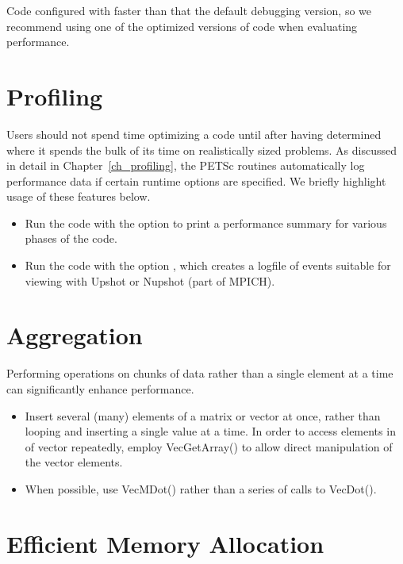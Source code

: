 {{Code configured with  
faster than that the default debugging version, so we recommend using one
of the optimized versions of code when evaluating performance.

\section{Profiling}
  

Users should not spend time optimizing a code until after having determined
where it spends the bulk of its time on realistically sized problems.
As discussed in detail in Chapter~\ref{ch_profiling}, the PETSc
routines automatically log performance data if certain runtime options
are specified.  We briefly highlight usage of these features below.

\begin{itemize}
\item Run the code with the option  to print a performance
   summary for various phases of the code. 

\item Run the code with the option  \trl{[logfilename]}, which creates a
   logfile of events suitable for viewing with Upshot or Nupshot (part of
   MPICH). 

\end{itemize}

\section{Aggregation}

Performing operations on chunks of data rather than a single element
at a time can significantly enhance performance.  
\begin{itemize}
\item Insert several (many) elements of a matrix or vector at once, rather 
   than looping and inserting a single value at a time.  In order to
   access elements in of vector repeatedly, employ {VecGetArray()} to allow 
   direct manipulation of the vector elements. 

\item When possible, use VecMDot() rather than a series of calls to VecDot().
\end{itemize}

\section{Efficient Memory Allocation}
\label{sec_perf_memory}

}}

